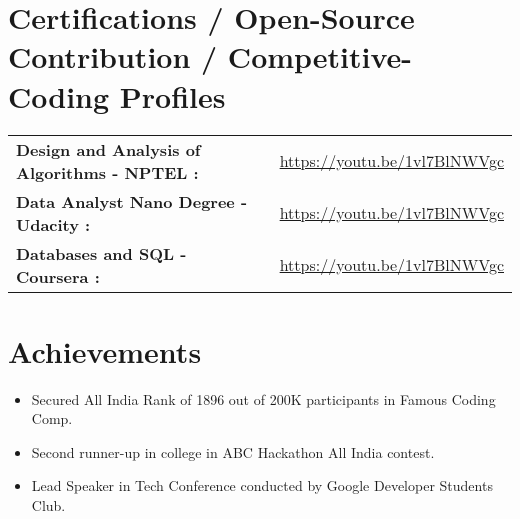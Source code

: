 \documentclass[a4paper,11.75pt]{scrartcl} %
\begin{document}
\section{Certifications / Open-Source Contribution / Competitive-Coding Profiles}
\begin{tabular}{p{19em} p{0.5em} p{30em}}
        \textbf{\small{Design and Analysis of Algorithms - NPTEL :}}&  &  \small{\href{https://youtu.be/1vl7BlNWVgc}{https://youtu.be/1vl7BlNWVgc}} \\
        \textbf{\small{Data Analyst Nano Degree - Udacity :}} &  & \small{\href{https://youtu.be/1vl7BlNWVgc}{https://youtu.be/1vl7BlNWVgc}}  \\
        \textbf{\small{Databases and SQL - Coursera :}} &  & \small{\href{https://youtu.be/1vl7BlNWVgc}{https://youtu.be/1vl7BlNWVgc}}
\end{tabular}
\vspace{-12pt}


\section{Achievements}
    \begin{itemize}[itemsep=-0.2pt, parsep=3pt]
        \item\small Secured All India Rank of 1896 out of 200K participants in Famous Coding Comp.
        \item Second runner-up in college in ABC Hackathon All India contest.
        \item Lead Speaker in Tech Conference conducted by Google Developer Students Club.
    \end{itemize}
    
\end{document}

